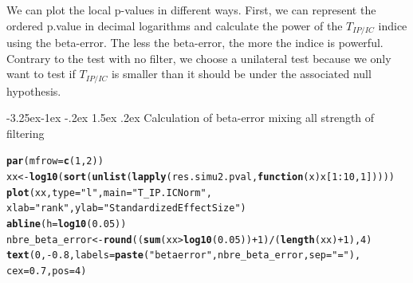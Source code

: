 \documentclass[12pt]{article}\usepackage[]{graphicx}\usepackage[]{color}
\makeatletter
\newcommand{\hlnum}[1]{\textcolor[rgb]{0.686,0.059,0.569}{#1}}%
\newcommand{\hlstr}[1]{\textcolor[rgb]{0.192,0.494,0.8}{#1}}%
\newcommand{\hlopt}[1]{\textcolor[rgb]{0,0,0}{#1}}%
\newcommand{\hlstd}[1]{\textcolor[rgb]{0.345,0.345,0.345}{#1}}%
\newcommand{\hlkwa}[1]{\textcolor[rgb]{0.161,0.373,0.58}{\textbf{#1}}}%
\newcommand{\hlkwb}[1]{\textcolor[rgb]{0.69,0.353,0.396}{#1}}%
\newcommand{\hlkwc}[1]{\textcolor[rgb]{0.333,0.667,0.333}{#1}}%
\newcommand{\hlkwd}[1]{\textcolor[rgb]{0.737,0.353,0.396}{\textbf{#1}}}%
\newenvironment{kframe}{%
 \def\at@end@of@kframe{}%
 \ifinner\ifhmode%
  \def\at@end@of@kframe{\end{minipage}}%
  \begin{minipage}{\columnwidth}%
 \fi\fi%
 \def\FrameCommand##1{\hskip\@totalleftmargin \hskip-\fboxsep
 \colorbox{shadecolor}{##1}\hskip-\fboxsep
     \hskip-\linewidth \hskip-\@totalleftmargin \hskip\columnwidth}%
 \MakeFramed {\advance\hsize-\width
   \@totalleftmargin\z@ \linewidth\hsize
   \@setminipage}}%
 {\par\unskip\endMakeFramed%
 \at@end@of@kframe}
\newenvironment{knitrout}{}{} %
\newcounter {subsubsubsection}[subsubsection]
\newcommand\subsubsubsection{\@startsection{subsubsubsection}{4}{\z@}%
          {-3.25ex\@plus -1ex \@minus -.2ex}%
          {1.5ex \@plus .2ex}%
          {\normalfont\normalsize\bfseries}}
\makeatother
\begin{document}
We can plot the local p-values in different ways. First, we can represent the ordered p.value in decimal logarithms and calculate the power of the $T_{IP/IC}$ indice using the beta-error. The less the beta-error, the more the indice is powerful. Contrary to the test with no filter, we choose a unilateral test because we only want to test if $T_{IP/IC}$ is smaller than it should be under the associated null hypothesis.

  \subsubsubsection {Calculation of beta-error mixing all strength of filtering}
 
\begin{knitrout}\small
{}\color{fgcolor}\begin{kframe}
\begin{alltt}
\hlkwd{par}\hlstd{(}\hlkwc{mfrow} \hlstd{=} \hlkwd{c}\hlstd{(}\hlnum{1}\hlstd{,} \hlnum{2}\hlstd{))}
\hlstd{xx} \hlkwb{<-} \hlkwd{log10}\hlstd{(}\hlkwd{sort}\hlstd{(}\hlkwd{unlist}\hlstd{(}\hlkwd{lapply}\hlstd{(res.simu2.pval,} \hlkwa{function}\hlstd{(}\hlkwc{x}\hlstd{) x[}\hlnum{1}\hlopt{:}\hlnum{10}\hlstd{,} \hlnum{1}\hlstd{]))))}
\hlkwd{plot}\hlstd{(xx,} \hlkwc{type} \hlstd{=} \hlstr{"l"}\hlstd{,} \hlkwc{main} \hlstd{=} \hlstr{"T_IP.IC Norm"}\hlstd{,}
     \hlkwc{xlab} \hlstd{=} \hlstr{"rank"}\hlstd{,} \hlkwc{ylab} \hlstd{=} \hlstr{"Standardized Effect Size"}\hlstd{)}
\hlkwd{abline}\hlstd{(}\hlkwc{h} \hlstd{=} \hlkwd{log10}\hlstd{(}\hlnum{0.05}\hlstd{))}
\hlstd{nbre_beta_error} \hlkwb{<-} \hlkwd{round}\hlstd{((}\hlkwd{sum}\hlstd{(xx}\hlopt{>}\hlkwd{log10}\hlstd{(}\hlnum{0.05}\hlstd{))}\hlopt{+}\hlnum{1}\hlstd{)}\hlopt{/}\hlstd{(}\hlkwd{length}\hlstd{(xx)}\hlopt{+}\hlnum{1}\hlstd{),} \hlnum{4}\hlstd{)}
\hlkwd{text}\hlstd{(}\hlnum{0}\hlstd{,} \hlopt{-}\hlnum{0.8}\hlstd{,} \hlkwc{labels} \hlstd{=} \hlkwd{paste}\hlstd{(}\hlstr{"beta error"}\hlstd{, nbre_beta_error,} \hlkwc{sep} \hlstd{=} \hlstr{" = "}\hlstd{),}
  \hlkwc{cex} \hlstd{=} \hlnum{0.7}\hlstd{,} \hlkwc{pos} \hlstd{=} \hlnum{4}\hlstd{)}


\end{alltt}
\end{kframe}
\end{knitrout}
\end{document}

